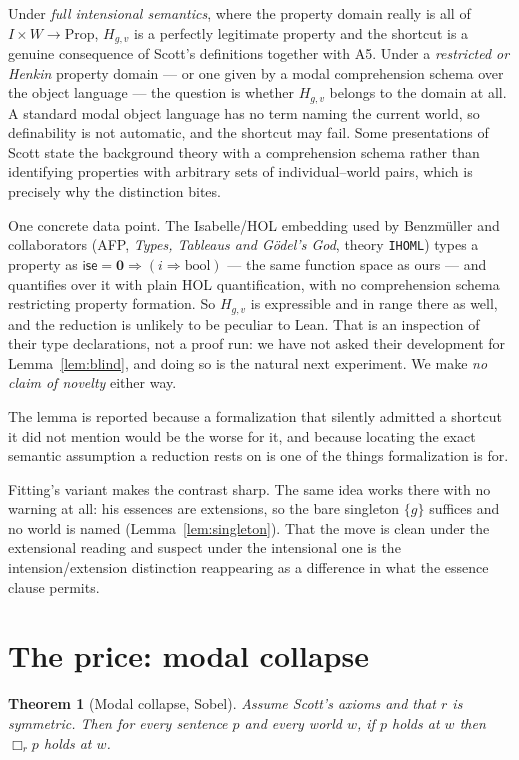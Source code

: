\documentclass[11pt]{article}
\theoremstyle{plain}
\newtheorem{theorem}{Theorem}
\theoremstyle{definition}
\newcommand{\Prp}{\mathrm{Prop}}
\begin{document}
Under \emph{full intensional semantics}, where the property domain really is
all of $I \times W \to \Prp$, $H_{g,v}$ is a perfectly legitimate property and
the shortcut is a genuine consequence of Scott's definitions together with A5.
Under a \emph{restricted or Henkin} property domain --- or one given by a modal
comprehension schema over the object language --- the question is whether
$H_{g,v}$ belongs to the domain at all. A standard modal object language has
no term naming the current world, so definability is not automatic, and the
shortcut may fail. Some presentations of Scott state the background theory
with a comprehension schema rather than identifying properties with arbitrary
sets of individual--world pairs, which is precisely why the distinction bites.

One concrete data point. The Isabelle/HOL embedding used by Benzm\"uller and
collaborators (AFP, \emph{Types, Tableaus and Gödel's God}, theory
\verb|IHOML|) types a property as $\mathsf{ise} = \mathbf{0} \Rightarrow
(i \Rightarrow \mathrm{bool})$ --- the same function space as ours --- and
quantifies over it with plain HOL quantification, with no comprehension schema
restricting property formation. So $H_{g,v}$ is expressible and in range there
as well, and the reduction is unlikely to be peculiar to Lean. That is an
inspection of their type declarations, not a proof run: we have not asked their
development for Lemma~\ref{lem:blind}, and doing so is the natural next
experiment. We make \emph{no claim of novelty} either way.

The lemma is reported because a formalization that silently admitted a
shortcut it did not mention would be the worse for it, and because locating
the exact semantic assumption a reduction rests on is one of the things
formalization is for.

Fitting's variant makes the contrast sharp. The same idea works there with no
warning at all: his essences are extensions, so the bare singleton $\{g\}$
suffices and no world is named (Lemma~\ref{lem:singleton}). That the move is
clean under the extensional reading and suspect under the intensional one is
the intension/extension distinction reappearing as a difference in what the
essence clause permits.

\section{The price: modal collapse}\label{sec:collapse}

\begin{theorem}[Modal collapse, Sobel]\label{thm:collapse}
Assume Scott's axioms and that $r$ is symmetric. Then for every sentence $p$
and every world $w$, if $p$ holds at $w$ then $\Box_r p$ holds at $w$.
\end{theorem}
\end{document}
